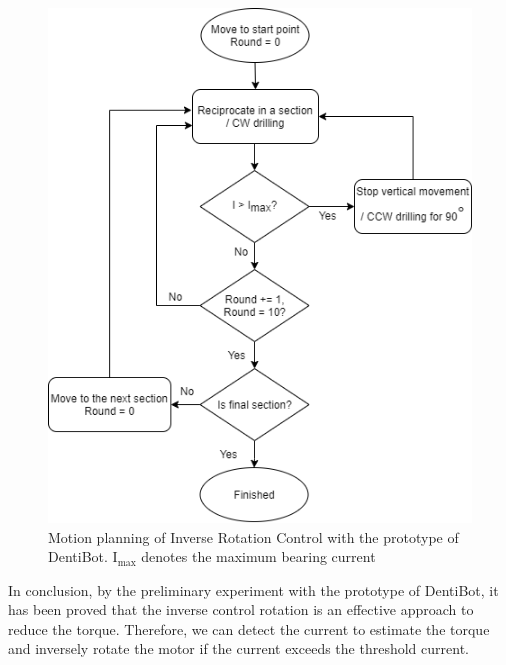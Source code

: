 \vspace{-8mm}
\begin{figure}[htbp]
\begin{center}
\includegraphics[width=0.65\linewidth]{Images/inverse_rotation.png}
\caption{Motion planning of Inverse Rotation Control with the prototype of DentiBot. $\mathrm{I_{max}}$ denotes the maximum bearing current}
\label{fig: inverse_rotation} 
\end{center}
\end{figure}
\par
In conclusion, by the preliminary experiment with the prototype of DentiBot, it has been proved that the inverse control rotation is an effective approach to reduce the torque. Therefore, we can detect the current to estimate the torque and inversely rotate the motor if the current exceeds the threshold current. 
